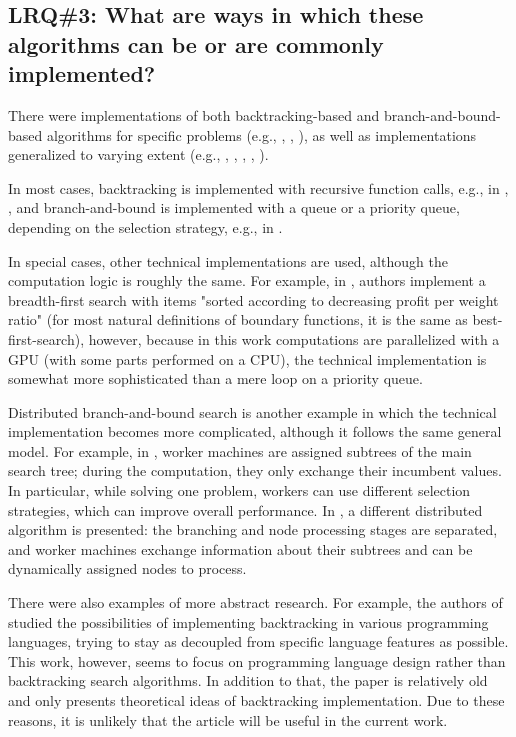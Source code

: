 \subsection{LRQ\#3: What are ways in which these algorithms can be or are commonly implemented?}

There were implementations of both backtracking-based and branch-and-bound-based algorithms
for specific problems
(e.g., \cite{bard1990bilevel}, \cite{breuel2003geometric}, \cite{lalami2012gpu}),
as well as implementations generalized to varying extent
(e.g., \cite{narkawicz2013formalnasa}, \cite{smirnov2017concur}, \cite{finkel1987distrib},
\cite{prenner1972proglangs}, \cite{johnson1988modular}).

In most cases, backtracking is implemented with recursive function calls,
e.g., in \cite{narkawicz2013formalnasa}, \cite{bard1990bilevel},
and branch-and-bound is implemented with a queue or a priority queue,
depending on the selection strategy, e.g., in \cite{breuel2003geometric}.

In special cases, other technical implementations are used, although the computation logic
is roughly the same. For example, in \cite{lalami2012gpu}, authors implement a
breadth-first search with items "sorted according to decreasing profit per weight ratio"
(for most natural definitions of boundary functions, it is the same as best-first-search),
however, because in this work computations are parallelized with a GPU
(with some parts performed on a CPU), the technical implementation is somewhat more
sophisticated than a mere loop on a priority queue.

Distributed branch-and-bound search is another example in which the technical implementation
becomes more complicated, although it follows the same general model. For example,
in \cite{smirnov2017concur}, worker machines are assigned subtrees of the main search tree;
during the computation, they only exchange their incumbent values. In particular, while solving one
problem, workers can use different selection strategies, which can improve overall performance.
In \cite{finkel1987distrib}, a different distributed algorithm is presented: the branching and
node processing stages are separated, and worker machines exchange information about their
subtrees and can be dynamically assigned nodes to process.

There were also examples of more abstract research. For example, the
authors of \cite{prenner1972proglangs} studied the possibilities of implementing
backtracking in various programming languages, trying to stay as decoupled from specific language
features as possible. This work, however, seems to focus on programming language design
rather than backtracking search algorithms. In addition to that, the paper is relatively old and
only presents theoretical ideas of backtracking implementation. Due to these reasons, it is unlikely
that the article will be useful in the current work.

